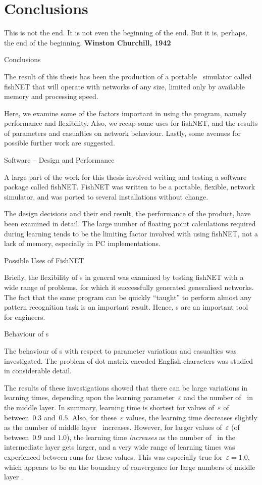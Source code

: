 \part {Conclusions} {This is not the end. It is not even the beginning
of the end. But it is, perhaps, the end of the beginning. {\bf
Winston Churchill, 1942}}

\chap Conclusions

The result of this thesis has been the production of a portable
\nn\ simulator called fishNET that will operate with networks of any
size, limited only by available memory and processing speed.

Here, we examine some of the factors important in using the program,
namely performance and flexibility.
Also, we recap some uses for fishNET, and the results of parameters
and casualties on network behaviour.
Lastly, some avenues for possible further work are suggested.

\sec Software -- Design and Performance

A large part of the work for this thesis involved writing and
testing a software package called fishNET.
FishNET was written to be a portable, flexible, network simulator,
and was ported to several installations without change.

The design decisions and their end result, the performance of the
product, have been examined in detail.
The large number of floating point calculations required during
learning tends to be the limiting factor involved with using
fishNET, not a lack of memory, especially in PC implementations.

\sec Possible Uses of FishNET

Briefly, the flexibility of \nn s in general was examined by
testing fishNET with a wide range of problems, for which it
successfully generated generalised networks.
The fact that the same program can be quickly ``taught'' to perform
almost any pattern recognition task is an important result.
Hence, \nn s are an important tool for engineers.

\sec Behaviour of \NN s

The behaviour of \nn s with respect to parameter variations and
casualties was investigated.
The problem of dot-matrix encoded English characters was studied in
considerable detail.

The results of these investigations showed that there can be large
variations in learning times, depending upon the learning
parameter~$\varepsilon$ and the number of \neus\ in the middle
layer.
In summary, learning time is shortest for values of~$\varepsilon$ of
between~$0.3$ and~$0.5$.
Also, for these~$\varepsilon$ values, the learning time decreases
slightly as the number of middle layer \neus\ increases.
However, for larger values of~$\varepsilon$ (of between~$0.9$ and $1.0$), the
learning time {\sl increases\/} as the number of \neus\ in the
intermediate layer gets larger, and a very wide range of learning
times was experienced between runs for these values.
This was especially true for~$\varepsilon = 1.0$, which appears to
be on the boundary of convergence for large numbers of middle layer
\neus.

